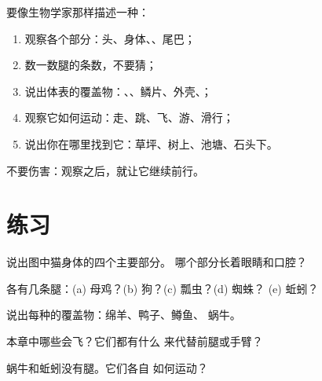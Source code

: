 \begin{method}[观察动物]\label{met:g1:animals-around-us:observe}
要像生物学家那样描述一种：
\begin{enumerate}
  \item 观察各个部分：头、身体、、尾巴；
  \item 数一数腿的条数，不要猜；
  \item 说出体表的覆盖物：、、鳞片、外壳、；
  \item 观察它如何运动：走、跳、飞、游、滑行；
  \item 说出你在哪里找到它：草坪、树上、池塘、石头下。
\end{enumerate}
不要伤害：观察之后，就让它继续前行。
\end{method}

\section{练习}

\begin{exercise}[$\star$]\label{exo:g1:animals-around-us:1}
说出图中猫身体的四个主要部分。
哪个部分长着眼睛和口腔？
\end{exercise}

\begin{exercise}[$\star$]\label{exo:g1:animals-around-us:2}
各有几条腿：(a) 母鸡？(b) 狗？(c) 瓢虫？(d) 蜘蛛？
(e) 蚯蚓？
\end{exercise}

\begin{exercise}[$\star$]\label{exo:g1:animals-around-us:3}
说出每种的覆盖物：绵羊、鸭子、鳟鱼、
蜗牛。
\end{exercise}

\begin{exercise}[$\star$]\label{exo:g1:animals-around-us:4}
本章中哪些会飞？它们都有什么
来代替前腿或手臂？
\end{exercise}

\begin{exercise}[$\star$]\label{exo:g1:animals-around-us:5}
蜗牛和蚯蚓没有腿。它们各自
如何运动？
\end{exercise}

